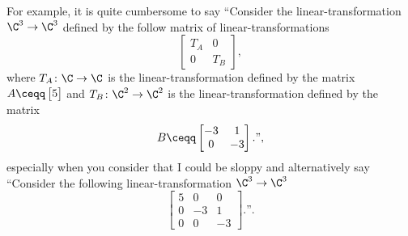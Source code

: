 For example, it is quite cumbersome to say ``Consider the linear-transformation $\C ^3\rightarrow \C ^3$ defined by the follow matrix of linear-transformations
\begin{equation}
	\begin{bmatrix}T_A & 0 \\ 0 & T_B\end{bmatrix},
\end{equation}
where $T_A\colon \C \rightarrow \C$ is the linear-transformation defined by the matrix $A\ceqq \begin{bmatrix}5\end{bmatrix}$ and $T_B\colon \C ^2\rightarrow \C ^2$ is the linear-transformation defined by the matrix
\begin{equation}
	B\ceqq \begin{bmatrix}-3 & 1 \\ 0 & -3\end{bmatrix}.\text{''},
\end{equation}
especially when you consider that I could be sloppy and alternatively say ``Consider the following linear-transformation $\C ^3\rightarrow \C ^3$
\begin{equation}
	\begin{bmatrix}5 & 0 & 0 \\ 0 & -3 & 1 \\ 0 & 0 & -3\end{bmatrix}.\text{''}.
\end{equation}

